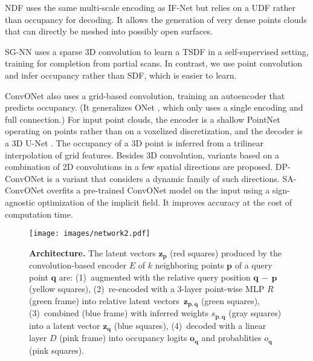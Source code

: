 \documentclass[10pt,twocolumn,letterpaper]{article}
\newcommand{\encoder}{E}
\newcommand{\latentv}{{\mathbf{z}}}
\newcommand{\occupancy}{\mathbf{o}}
\newcommand{\occupancyp}{{o}}
\newcommand{\point}{{\mathbf{p}}}
\newcommand{\qpoint}{{\mathbf{q}}}
\newcommand{\significance}{s}
\begin{document}
NDF \cite{Chibane2020Neural} uses the same multi-scale encoding as IF-Net but relies on a UDF rather than occupancy for decoding. It allows the generation of very dense points clouds that can directly be meshed into possibly open surfaces.

SG-NN \cite{dai2020sgnn} uses a sparse 3D convolution \cite{choy20194d} to learn a TSDF in a self-supervised setting, training for completion from partial scans.
In contrast, we use point convolution and infer occupancy rather than SDF, which is easier to learn.

ConvONet \cite{Peng2020ECCV} also uses a grid-based convolution, training an autoencoder that predicts occupancy. (It generalizes ONet \cite{Mescheder2019CVPR}, which only uses a single encoding and full connection.) For input point clouds, the encoder is a shallow PointNet \cite{Qi2017CVPR} operating on points rather than on a voxelized discretization, and the decoder is a 3D U-Net \cite{Cciccek2016MICCAI}. The occupancy of a 3D point is inferred from a trilinear interpolation of grid features. Besides 3D convolution, variants based on a combination of 2D convolutions in a few spatial directions are proposed. DP-ConvONet \cite{Lionar_2021_WACV} is a variant that considers a dynamic family of such directions.
SA-ConvONet \cite{tang2021sign} overfits a pre-trained ConvONet model on the input using a sign-agnostic optimization of the implicit field. It improves accuracy at the cost of computation time. 

\begin{figure*}
    \centering
    \texttt{[image: images/network2.pdf]}
    \vspace{-6mm}
    \caption{\textbf{Architecture.} The latent vectors $\latentv_{\point}$ (red squares) produced by the convolution-based encoder $\encoder$ of $k$ neighboring points $\point$ of a query point $\qpoint$ are:
    (1)~augmented with the relative query position $\qpoint \,{-}\, \point$ (yellow squares), 
    (2)~re-encoded with a 3-layer point-wise MLP $R$ (green frame) into relative latent vectors~$\latentv_{\point,\qpoint}$ (green squares), 
    (3)~combined (blue frame) with inferred weights $\significance_{\point,\qpoint}$ (gray squares) into a latent vector $\latentv_\qpoint$ (blue squares),
    (4)~decoded with a linear layer $D$ (pink frame) into occupancy logits $\occupancy_{\qpoint}$ and probablities $\occupancyp_{\qpoint}$ (pink squares).
    } 
    \label{fig:decoder}
    \vspace{-2mm}
\end{figure*}
\end{document}
